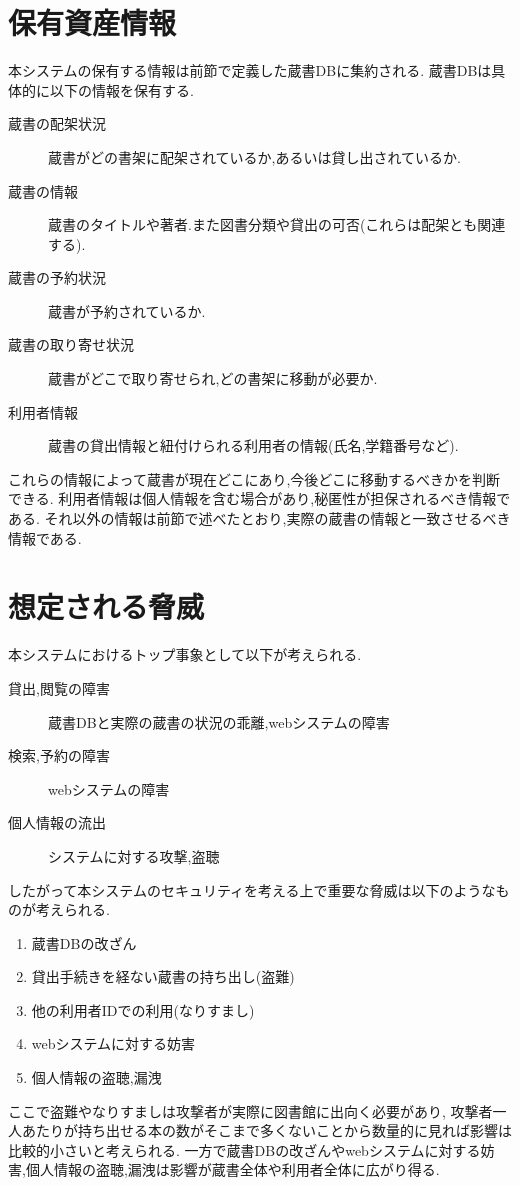 \documentclass[uplatex,a4j,11pt,dvipdfmx]{jsarticle}
\begin{document}
\section{保有資産情報}
本システムの保有する情報は前節で定義した蔵書DBに集約される.
蔵書DBは具体的に以下の情報を保有する.
\begin{description}
  \item[蔵書の配架状況] 蔵書がどの書架に配架されているか,あるいは貸し出されているか.
  \item[蔵書の情報] 蔵書のタイトルや著者.また図書分類や貸出の可否(これらは配架とも関連する).
  \item[蔵書の予約状況] 蔵書が予約されているか.
  \item[蔵書の取り寄せ状況] 蔵書がどこで取り寄せられ,どの書架に移動が必要か.
  \item[利用者情報] 蔵書の貸出情報と紐付けられる利用者の情報(氏名,学籍番号など).
\end{description}
これらの情報によって蔵書が現在どこにあり,今後どこに移動するべきかを判断できる.
利用者情報は個人情報を含む場合があり,秘匿性が担保されるべき情報である.
それ以外の情報は前節で述べたとおり,実際の蔵書の情報と一致させるべき情報である.
\section{想定される脅威}
本システムにおけるトップ事象として以下が考えられる.
\begin{description}
  \item [貸出,閲覧の障害] 蔵書DBと実際の蔵書の状況の乖離,webシステムの障害
  \item [検索,予約の障害] webシステムの障害
  \item [個人情報の流出] システムに対する攻撃,盗聴
\end{description}
したがって本システムのセキュリティを考える上で重要な脅威は以下のようなものが考えられる.
\begin{enumerate}
  \item 蔵書DBの改ざん
  \item 貸出手続きを経ない蔵書の持ち出し(盗難)
  \item 他の利用者IDでの利用(なりすまし)
  \item webシステムに対する妨害
  \item 個人情報の盗聴,漏洩
\end{enumerate}
ここで盗難やなりすましは攻撃者が実際に図書館に出向く必要があり,
攻撃者一人あたりが持ち出せる本の数がそこまで多くないことから数量的に見れば影響は比較的小さいと考えられる.
一方で蔵書DBの改ざんやwebシステムに対する妨害,個人情報の盗聴,漏洩は影響が蔵書全体や利用者全体に広がり得る.
\end{document}
